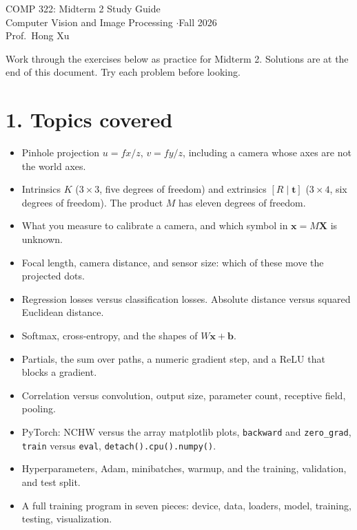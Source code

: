 \documentclass[11pt]{article}
\begin{document}
\begin{center}
{\Large COMP 322: Midterm 2 Study Guide}\\[0.25em]
Computer Vision and Image Processing \quad$\cdot$\quad Fall 2026\\[0.15em]
Prof.\ Hong Xu
\end{center}

\noindent
Work through the exercises below as practice for Midterm 2. Solutions are at the end of this document. Try each problem before looking.

\section*{1. Topics covered}

\begin{itemize}
\item Pinhole projection $u=fx/z$, $v=fy/z$, including a camera whose axes are not the world axes.
\item Intrinsics $K$ ($3\times 3$, five degrees of freedom) and extrinsics $[R\mid\mathbf{t}]$ ($3\times 4$, six degrees of freedom). The product $M$ has eleven degrees of freedom.
\item What you measure to calibrate a camera, and which symbol in $\mathbf{x}=M\mathbf{X}$ is unknown.
\item Focal length, camera distance, and sensor size: which of these move the projected dots.
\item Regression losses versus classification losses. Absolute distance versus squared Euclidean distance.
\item Softmax, cross-entropy, and the shapes of $W\mathbf{x}+\mathbf{b}$.
\item Partials, the sum over paths, a numeric gradient step, and a ReLU that blocks a gradient.
\item Correlation versus convolution, output size, parameter count, receptive field, pooling.
\item PyTorch: NCHW versus the array matplotlib plots, \texttt{backward} and \texttt{zero\_grad}, \texttt{train} versus \texttt{eval}, \texttt{detach().cpu().numpy()}.
\item Hyperparameters, Adam, minibatches, warmup, and the training, validation, and test split.
\item A full training program in seven pieces: device, data, loaders, model, training, testing, visualization.
\end{itemize}
\end{document}
